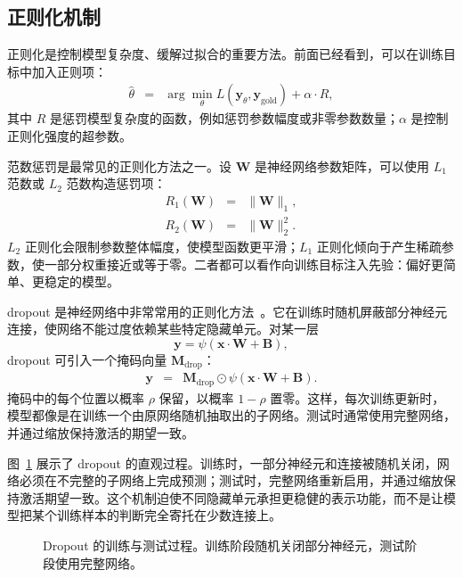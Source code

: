 \subsection{正则化机制}

正则化是控制模型复杂度、缓解过拟合的重要方法。前面已经看到，可以在训练目标中加入正则项：
\begin{eqnarray}
\hat{\theta}
& = &
\arg\min_{\theta}
L(\mathbf{y}_{\theta},\mathbf{y}_{\mathrm{gold}})
+
\alpha\cdot R,
\end{eqnarray}
\noindent 其中 $R$ 是惩罚模型复杂度的函数，例如惩罚参数幅度或非零参数数量；$\alpha$ 是控制正则化强度的超参数。

范数惩罚是最常见的正则化方法之一。设 $\mathbf{W}$ 是神经网络参数矩阵，可以使用 $L_1$ 范数或 $L_2$ 范数构造惩罚项：
\begin{eqnarray}
R_1(\mathbf{W}) &=& \|\mathbf{W}\|_1,\\
R_2(\mathbf{W}) &=& \|\mathbf{W}\|_2^2.
\end{eqnarray}
$L_2$ 正则化会限制参数整体幅度，使模型函数更平滑；$L_1$ 正则化倾向于产生稀疏参数，使一部分权重接近或等于零。二者都可以看作向训练目标注入先验：偏好更简单、更稳定的模型。

dropout 是神经网络中非常常用的正则化方法~\cite{hinton-etal:2012improving,SrivastavaEtAl2014Dropout}。它在训练时随机屏蔽部分神经元连接，使网络不能过度依赖某些特定隐藏单元。对某一层
\[
\mathbf{y}=\psi(\mathbf{x}\cdot\mathbf{W}+\mathbf{B}),
\]
dropout 可引入一个掩码向量 $\mathbf{M}_{\mathrm{drop}}$：
\begin{eqnarray}
\mathbf{y}
& = &
\mathbf{M}_{\mathrm{drop}}
\odot
\psi(\mathbf{x}\cdot\mathbf{W}+\mathbf{B}).
\end{eqnarray}
掩码中的每个位置以概率 $\rho$ 保留，以概率 $1-\rho$ 置零。这样，每次训练更新时，模型都像是在训练一个由原网络随机抽取出的子网络。测试时通常使用完整网络，并通过缩放保持激活的期望一致。

图~\ref{fig:aml-dropout-network} 展示了 dropout 的直观过程。训练时，一部分神经元和连接被随机关闭，网络必须在不完整的子网络上完成预测；测试时，完整网络重新启用，并通过缩放保持激活期望一致。这个机制迫使不同隐藏单元承担更稳健的表示功能，而不是让模型把某个训练样本的判断完全寄托在少数连接上。

\begin{figure}[htbp]
  \centering
  
  \caption{Dropout 的训练与测试过程。训练阶段随机关闭部分神经元，测试阶段使用完整网络。}
  \label{fig:aml-dropout-network}
\end{figure}

